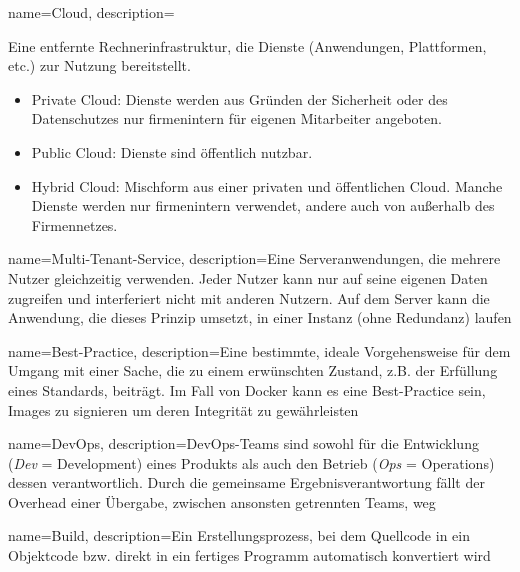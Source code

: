 



{%
  name={Cloud},
  description={Eine entfernte Rechnerinfrastruktur, die Dienste (Anwendungen, Plattformen, etc.) zur Nutzung bereitstellt.
    \begin{itemize}
      \item Private Cloud: Dienste werden aus Gründen der Sicherheit oder des Datenschutzes nur firmenintern für eigenen Mitarbeiter angeboten.
      \item Public Cloud: Dienste sind öffentlich nutzbar.
      \item Hybrid Cloud: Mischform aus einer privaten und öffentlichen Cloud. Manche Dienste werden nur firmenintern verwendet, andere auch von außerhalb des Firmennetzes.
    \end{itemize}\cite{cloud}
  }
}

{%
  name={Multi-Tenant-Service},
  description={Eine Serveranwendungen, die mehrere Nutzer gleichzeitig verwenden. Jeder Nutzer kann nur auf seine eigenen Daten zugreifen und interferiert nicht mit anderen Nutzern. Auf dem Server kann die Anwendung, die dieses Prinzip umsetzt, in einer Instanz (ohne Redundanz) laufen \cite{multitenant}}
}

{%
  name={Best-Practice},
  description={Eine bestimmte, ideale Vorgehensweise für dem Umgang mit einer Sache, die zu einem erwünschten Zustand, z.B. der Erfüllung eines Standards, beiträgt. Im Fall von Docker kann es eine Best-Practice sein, Images zu signieren um deren Integrität zu gewährleisten}
}

{%
  name={DevOps},
  description={DevOps-Teams sind sowohl für die Entwicklung (\emph{Dev} = Development) eines Produkts als auch den Betrieb (\emph{Ops} = Operations) dessen verantwortlich. Durch die gemeinsame Ergebnisverantwortung fällt der Overhead einer Übergabe, zwischen ansonsten getrennten Teams, weg \cite{devops}}
}

{%
  name={Build},
  description={Ein Erstellungsprozess, bei dem Quellcode in ein Objektcode bzw. direkt in ein fertiges Programm automatisch konvertiert wird}
}


